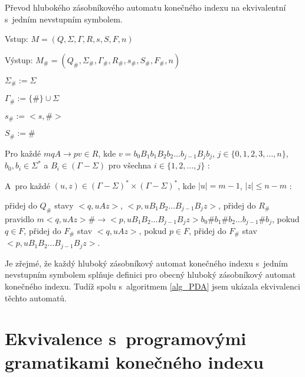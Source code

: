 \begin{Alg} \label{alg_PDA}
Převod hlubokého zásobníkového automatu konečného indexu na ekvivalentní s~jedním nevstupním symbolem.

\begin{list}{}{\setlength\parsep{0cm} \setlength\itemsep{0cm} \setlength\leftmargin{1em}}
   \item Vstup: $M = (Q,\Sigma,\Gamma, R, s, S, F, n)$ 
   \item Výstup: $M_\# = (Q_\#,{\Sigma}_\#,{\Gamma}_\#, R_\#, s_\#,  S_\#, F_\#, n)$ \medskip
  
  \item ${\Sigma}_\# := \Sigma$
  \item ${\Gamma}_\# :=\{\#\} \cup \Sigma$
  \item $s_\# := <s,\#>$
  \item $S_\# := \# $ \medskip

  \item Pro každé $mqA \rightarrow pv \in R$, kde $v = b_0 B_1 b_1 B_2 b_2 \dots b_{j-1} B_{j} b_j$, $j \in \{0,1,2,3,\dots,n\}$, $b_0,b_i \in {\Sigma}^*$ a $B_i \in (\Gamma - \Sigma)$ pro všechna $i \in \{1,2,\dots,j\}$ : \smallskip

  \subitem A~pro každé $(u,z) \in (\Gamma - \Sigma)^* \times (\Gamma - \Sigma)^*$, kde $|u|=m-1$, $|z|\le n-m$ : \smallskip

  \subsubitem přidej do $Q_\#$ stavy $<q, u A z>$, $<p, u B_1 B_2 \dots B_{j-1} B_{j} z>$,
  \subsubitem přidej do $R_\#$ pravidlo $m <q, u A z> \# \rightarrow <p, u B_1 B_2 \dots B_{j-1} B_{j} z> b_0 \# b_1 \# b_2 \dots b_{j-1} \# b_j $,
  \subsubitem pokud $q \in F$, přidej do $F_\#$ stav $<q, u A z>$,
  \subsubitem pokud $p \in F$, přidej do $F_\#$ stav $<p, u B_1 B_2 \dots B_{j-1} B_{j} z>$.

\end{list}
\end{Alg}

Je zřejmé, že každý hluboký zásobníkový automat konečného indexu s~jedním nevstupním symbolem splňuje definici pro obecný hluboký zásobníkový automat konečného indexu. Tudíž spolu s~algoritmem \ref{alg_PDA} jsem ukázala ekvivalenci těchto automatů.

\section{Ekvivalence s~programovými gramatikami konečného indexu}

